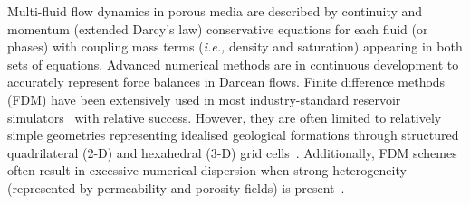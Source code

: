 \documentclass[preprint,authoryear,12pt]{elsarticle}
\newcommand{\ie}{{\it i.e., }}
\begin{document}
\medskip 
Multi-fluid flow dynamics in porous media are described by continuity and momentum (extended Darcy's law) conservative equations for each fluid (or phases) with coupling mass terms (\ie density and saturation) appearing in both sets of equations. Advanced numerical methods are in continuous development to accurately represent force balances in Darcean flows. Finite difference methods (FDM) have been extensively used in most industry-standard reservoir simulators~\citep{aziz_1986, chen_2005, chang_1990} with relative success. However, they are often limited to relatively simple geometries representing idealised geological formations through structured quadrilateral (2-D) and hexahedral (3-D) grid cells~\citep{mlacnik_2004, king_1999}. Additionally, FDM schemes often result in excessive numerical dispersion when strong heterogeneity (represented by permeability and porosity fields) is present~\citep{chavent_1986}.
\end{document}
